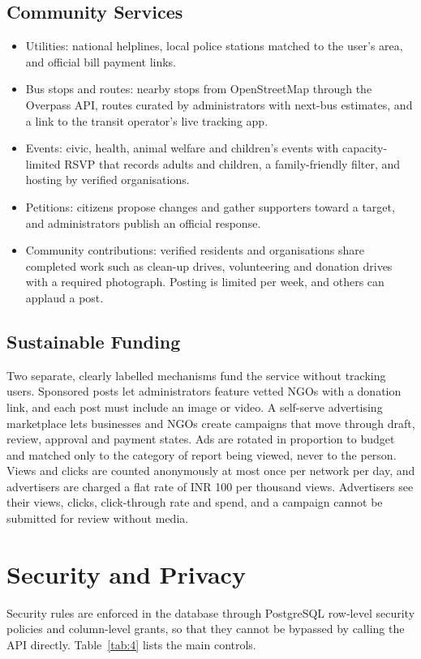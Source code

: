 \documentclass[conference]{IEEEtran}
\begin{document}
\subsection{Community Services}
\begin{itemize}
\item Utilities: national helplines, local police stations matched to the user's area, and official bill payment links.
\item Bus stops and routes: nearby stops from OpenStreetMap through the Overpass API, routes curated by administrators with next-bus estimates, and a link to the transit operator's live tracking app.
\item Events: civic, health, animal welfare and children's events with capacity-limited RSVP that records adults and children, a family-friendly filter, and hosting by verified organisations.
\item Petitions: citizens propose changes and gather supporters toward a target, and administrators publish an official response.
\item Community contributions: verified residents and organisations share completed work such as clean-up drives, volunteering and donation drives with a required photograph. Posting is limited per week, and others can applaud a post.
\end{itemize}
\subsection{Sustainable Funding}
Two separate, clearly labelled mechanisms fund the service without tracking users. Sponsored posts let administrators feature vetted NGOs with a donation link, and each post must include an image or video. A self-serve advertising marketplace lets businesses and NGOs create campaigns that move through draft, review, approval and payment states. Ads are rotated in proportion to budget and matched only to the category of report being viewed, never to the person. Views and clicks are counted anonymously at most once per network per day, and advertisers are charged a flat rate of INR 100 per thousand views. Advertisers see their views, clicks, click-through rate and spend, and a campaign cannot be submitted for review without media.

\section{Security and Privacy}
Security rules are enforced in the database through PostgreSQL row-level security policies \cite{b15} and column-level grants, so that they cannot be bypassed by calling the API directly. Table~\ref{tab:4} lists the main controls.
\end{document}
